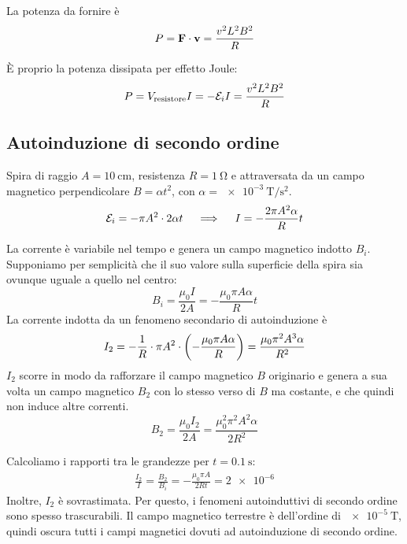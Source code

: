 La potenza da fornire è
\begin{equation}
    P = \mathbf{F} \cdot \mathbf{v} = \frac{v^2 L^2 B^2}{R}
\end{equation}

È proprio la potenza dissipata per effetto Joule:
\begin{equation}
    P = V_\text{resistore} I = - \mathcal{E}_i I = \frac{v^2 L^2 B^2}{R}
\end{equation}

\subsection{Autoinduzione di secondo ordine}

Spira di raggio $A = \qty{10}{\centi\metre}$, resistenza $R = \qty{1}{\ohm}$ e attraversata da un campo magnetico perpendicolare $B = \alpha t^2$, con $\alpha = \qty{e-3}{\tesla\per\second\squared}$.
\begin{equation}
    \mathcal{E}_i = - \pi A^2 \cdot 2 \alpha t
    \quad \implies \quad
    I = - \frac{2\pi A^2 \alpha}{R} t
\end{equation}

La corrente è variabile nel tempo e genera un campo magnetico indotto $B_i$.
Supponiamo per semplicità che il suo valore sulla superficie della spira sia ovunque uguale a quello nel centro:
\begin{equation}
    B_i = \frac{\mu_0 I}{2A} = - \frac{\mu_0 \pi A \alpha}{R}t
\end{equation}
La corrente indotta da un fenomeno secondario di autoinduzione è
\begin{equation}
    I_2 = -\frac{1}{R} \cdot \pi A^2 \cdot \left( - \frac{\mu_0 \pi A \alpha}{R} \right)
    = \frac{\mu_0 \pi^2 A^3 \alpha}{R^2}
\end{equation}
$I_2$ scorre in modo da rafforzare il campo magnetico $B$ originario e genera a sua volta un campo magnetico $B_2$ con lo stesso verso di $B$ ma costante, e che quindi non induce altre correnti.
\begin{equation}
    B_2 = \frac{\mu_0 I_2}{2 A} = \frac{\mu_0^2 \pi^2 A^2 \alpha}{2 R^2}
\end{equation}

Calcoliamo i rapporti tra le grandezze per $t = \qty{0.1}{\second}$:
\begin{gather}
    \frac{I_2}{I} = \frac{B_2}{B_i} = -\frac{\mu_0 \pi A}{2 R t}
    = \num{2e-6}
\end{gather}
Inoltre, $I_2$ è sovrastimata.
Per questo, i fenomeni autoinduttivi di secondo ordine sono spesso trascurabili.
Il campo magnetico terrestre è dell'ordine di $\qty{e-5}{\tesla}$, quindi oscura tutti i campi magnetici dovuti ad autoinduzione di secondo ordine.

